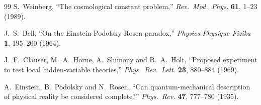 \documentclass[a4paper]{article}
\begin{document}
\begin{thebibliography}{99}
S.~Weinberg,
``The cosmological constant problem,''
\textit{Rev.\ Mod.\ Phys.} \textbf{61}, 1--23 (1989).

J.~S.~Bell,
``On the Einstein Podolsky Rosen paradox,''
\textit{Physics Physique Fizika} \textbf{1}, 195--200 (1964).

J.~F.~Clauser, M.~A.~Horne, A.~Shimony and R.~A.~Holt,
``Proposed experiment to test local hidden-variable theories,''
\textit{Phys.\ Rev.\ Lett.} \textbf{23}, 880--884 (1969).

A.~Einstein, B.~Podolsky and N.~Rosen,
``Can quantum-mechanical description of physical reality be considered complete?''
\textit{Phys.\ Rev.} \textbf{47}, 777--780 (1935).

\end{thebibliography}
\end{document}

